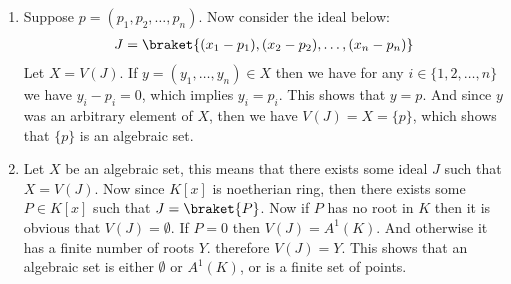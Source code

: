\begin{enumerate}[label=\ilabel]
    \item 
        Suppose $p = (p_1, p_2, \dots, p_n)$. Now consider the ideal below:
        \begin{gather*}
            J = \braket{(x_1 - p_1), (x_2 - p_2), \dots, (x_n - p_n)}
        \end{gather*}
        Let $X = V(J)$. If $y = (y_1, \dots, y_n) \in X$ then we have for any $i \in \{1, 2, \dots, n\}$ we have $y_i - p_i = 0$, which implies $y_i = p_i$. This shows that $y = p$. And since $y$ was an arbitrary element of $X$, then we have $V(J) = X = \{p\}$, which shows that $\{p\}$ is an algebraic set.

    \item
        Let $X$ be an algebraic set, this means that there exists some ideal $J$ such that $X = V(J)$. Now since $K[x]$ is noetherian ring, then there exists some $P \in K[x]$ such that $J = \braket{P}$. Now if $P$ has no root in $K$ then it is obvious that $V(J) = \emptyset$. If $P = 0$ then $V(J) = A^1(K)$. And otherwise it has a finite number of roots $Y$. therefore $V(J) = Y$. This shows that an algebraic set is either $\emptyset$ or $A^1(K)$, or is a finite set of points.
\end{enumerate} 